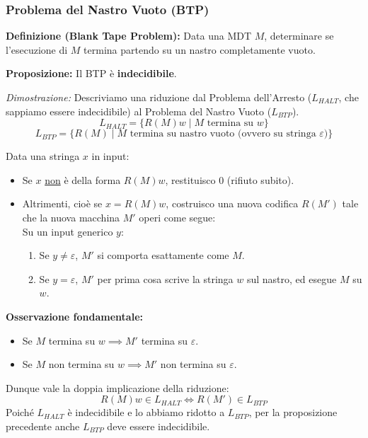 \vspace{0.8cm}
\subsubsection{Problema del Nastro Vuoto (BTP)}

\textbf{Definizione (Blank Tape Problem):} Data una MDT $M$, determinare se l'esecuzione di $M$ termina partendo su un nastro completamente vuoto.

\vspace{0.4cm}
\textbf{Proposizione:} Il BTP è \textbf{indecidibile}.

\vspace{0.2cm}
\textit{Dimostrazione:} Descriviamo una riduzione dal Problema dell'Arresto ($L_{HALT}$, che sappiamo essere indecidibile) al Problema del Nastro Vuoto ($L_{BTP}$).
$$ L_{HALT} = \{R(M)w \mid M \text{ termina su } w\} $$
$$ L_{BTP} = \{R(M) \mid M \text{ termina su nastro vuoto (ovvero su stringa } \varepsilon)\} $$

Data una stringa $x$ in input:
\begin{itemize}
    \item Se $x$ \underline{non} è della forma $R(M)w$, restituisco $0$ (rifiuto subito).
    \item Altrimenti, cioè se $x = R(M)w$, costruisco una nuova codifica $R(M')$ tale che la nuova macchina $M'$ operi come segue: \\
    Su un input generico $y$:
    \begin{enumerate}
        \item Se $y \neq \varepsilon$, $M'$ si comporta esattamente come $M$.
        \item Se $y = \varepsilon$, $M'$ per prima cosa scrive la stringa $w$ sul nastro, ed esegue $M$ su $w$.
    \end{enumerate}
\end{itemize}

\textbf{Osservazione fondamentale:}
\begin{itemize}
    \item Se $M$ termina su $w \implies M'$ termina su $\varepsilon$.
    \item Se $M$ non termina su $w \implies M'$ non termina su $\varepsilon$.
\end{itemize}
Dunque vale la doppia implicazione della riduzione:
$$ R(M)w \in L_{HALT} \iff R(M') \in L_{BTP} $$
Poiché $L_{HALT}$ è indecidibile e lo abbiamo ridotto a $L_{BTP}$, per la proposizione precedente anche $L_{BTP}$ deve essere indecidibile.

